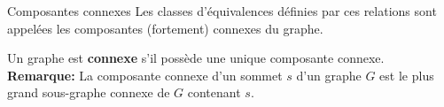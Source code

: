 \documentclass[french, 11pt]{article}
\begin{document}
\vspace*{-0.7cm}

\begin{defi}{Composantes connexes}{}
    Les classes d'équivalences définies par ces relations sont appelées les composantes (fortement) connexes du graphe.
\end{defi}

\vspace*{-0.7cm}

\begin{defi}{}{}
    Un graphe est \textbf{connexe} s'il possède une unique composante connexe.\\
    \textbf{Remarque:} La composante connexe d'un sommet $s$ d'un graphe $G$ est le plus grand sous-graphe connexe de $G$ contenant $s$. 
\end{defi}

\vspace*{-0.7cm}
\end{document}

